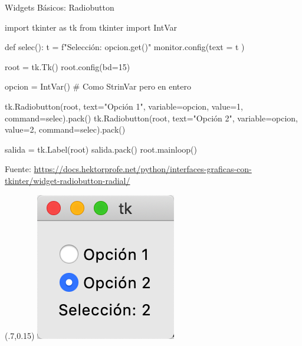 \documentclass[10pt, envcountsect , spanish]{beamer}
\begin{document}
\begin{frame}[fragile]{Widgets Básicos: Radiobutton}
{}

\small
\begin{pyverbatim}[][frame=single]
import tkinter as tk
from tkinter import IntVar

def selec():
    t = f"Selección: {opcion.get()}"
    monitor.config(text = t )

root = tk.Tk()
root.config(bd=15)

opcion = IntVar() # Como StrinVar pero en entero

tk.Radiobutton(root, text="Opción 1", variable=opcion,
            value=1, command=selec).pack()
tk.Radiobutton(root, text="Opción 2", variable=opcion,
            value=2, command=selec).pack()

salida = tk.Label(root)
salida.pack()
root.mainloop()
\end{pyverbatim}
{\tiny Fuente: \url{https://docs.hektorprofe.net/python/interfaces-graficas-con-tkinter/widget-radiobutton-radial/}}

\begin{textblock*}{.25\textwidth}(.7\textwidth,0.15\textheight)
\includegraphics[width=\textwidth]{fig/Radiobutton}
\end{textblock*}

\end{frame}
\end{document}
